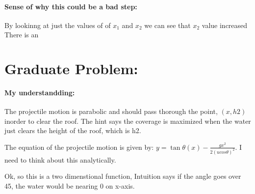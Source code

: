 \documentclass[12pt]{article}
\begin{document}
\paragraph*{Sense of why this could be a bad step: }By lookinng at just the values of of \(x_1\) and \(x_2\) we can see that \(x_2\) value increased \\
There is an 

\section*{Graduate Problem: }
\paragraph*{My understandding:}
The projectile motion is parabolic and should pass thorough the point, \((x,h2)\) inorder to clear the roof. 
The hint says the coverage is maximized when the water just clears the height of the roof, which is h2. 

The equation of the projectile motion is given by:
\(y = \tan\theta(x) - \frac{gx^2}{2(ucos\theta)^2}\).
I need to think about this analytically. 

Ok, so this is a two dimenstional function, 
Intuition says if the angle goes over 45, the water would be nearing 0 on x-axis. 
\end{document}
